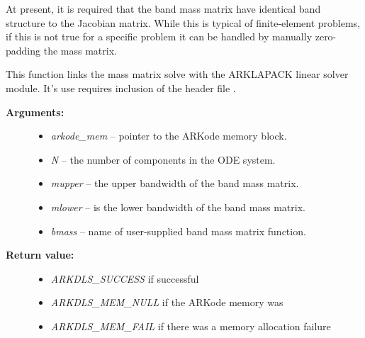 \documentclass[letterpaper,10pt,english]{sphinxmanual}
\begin{document}
\begin{fulllineitems}
At present, it is required that the band mass matrix have identical
band structure to the Jacobian matrix.  While this is typical of
finite-element problems, if this is not true for a specific problem
it can be handled by manually zero-padding the mass matrix.

\end{fulllineitems}


\begin{fulllineitems}
\label{c_interface/User_callable:c.ARKMassLapackBand}
This function links the mass matrix solve with the ARKLAPACK linear
solver module.  It's use requires inclusion of the header file
.
\begin{description}
\item[{\textbf{Arguments:}}] \leavevmode\begin{itemize}
\item {} 
\emph{arkode\_mem} -- pointer to the ARKode memory block.

\item {} 
\emph{N} -- the number of components in the ODE system.

\item {} 
\emph{mupper} -- the upper bandwidth of the band mass matrix.

\item {} 
\emph{mlower} -- is the lower bandwidth of the band mass matrix.

\item {} 
\emph{bmass} -- name of user-supplied band mass matrix function.

\end{itemize}

\item[{\textbf{Return value:}}] \leavevmode\begin{itemize}
\item {} 
\emph{ARKDLS\_SUCCESS}   if successful

\item {} 
\emph{ARKDLS\_MEM\_NULL}  if the ARKode memory was 

\item {} 
\emph{ARKDLS\_MEM\_FAIL}  if there was a memory allocation failure


\end{itemize}
\end{description}
\end{fulllineitems}
\end{document}
